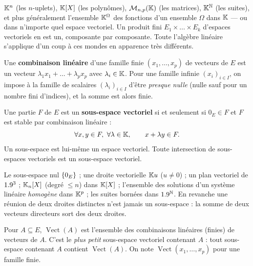 \begin{exemple}
$\mathbb{K}^{n}$ (les $n$-uplets), $\mathbb{K}[X]$ (les polynômes), $\mathcal{M}_{n,p}(\mathbb{K})$
(les matrices), $\mathbb{K}^{\mathbb{N}}$ (les suites), et plus généralement l'ensemble
$\mathbb{K}^{\Omega}$ des fonctions d'un ensemble $\Omega$ dans $\mathbb{K}$ — ou dans
n'importe quel espace vectoriel. Un produit fini $E_1\times\dots\times E_k$
d'espaces vectoriels en est un, composante par composante. Toute l'algèbre
linéaire s'applique d'un coup à ces mondes en apparence très différents.
\end{exemple}

\begin{definition}
Une \textbf{combinaison linéaire} d'une famille finie $(x_1,\dots,x_p)$ de
vecteurs de $E$ est un vecteur $\lambda_1x_1+\dots+\lambda_px_p$ avec
$\lambda_i\in\mathbb{K}$. Pour une famille infinie $(x_i)_{i\in I}$, on impose à la
famille de scalaires $(\lambda_i)_{i\in I}$ d'être \emph{presque nulle}
(nulle sauf pour un nombre fini d'indices), et la somme est alors finie.
\end{definition}


\begin{theoreme}
Une partie $F$ de $E$ est un \textbf{sous-espace vectoriel} si et seulement
si $0_E\in F$ et $F$ est stable par combinaison linéaire :
\[
\forall x,y\in F,\ \forall\lambda\in\mathbb{K},\qquad x+\lambda y\in F .
\]
Un sous-espace est lui-même un espace vectoriel. Toute intersection de
sous-espaces vectoriels est un sous-espace vectoriel.
\end{theoreme}

\begin{exemple}
Le sous-espace nul $\left\{0_E\right\}$ ; une droite vectorielle $\mathbb{K} u$ ($u\neq0$) ;
un plan vectoriel de $1.9^{3}$ ; $\mathbb{K}_n[X]$ (degré $\leqslant n$) dans
$\mathbb{K}[X]$ ; l'ensemble des solutions d'un système linéaire \emph{homogène}
dans $\mathbb{K}^{p}$ ; les suites bornées dans $1.9^{\mathbb{N}}$. En revanche une réunion
de deux droites distinctes n'est jamais un sous-espace : la somme de deux
vecteurs directeurs sort des deux droites.
\end{exemple}

\begin{definition}
Pour $A\subseteq E$, $\operatorname{Vect}(A)$ est l'ensemble des
combinaisons linéaires (finies) de vecteurs de $A$. C'est le \emph{plus
petit} sous-espace vectoriel contenant $A$ : tout sous-espace contenant $A$
contient $\operatorname{Vect}(A)$. On note
$\operatorname{Vect}(x_1,\dots,x_p)$ pour une famille finie.
\end{definition}

